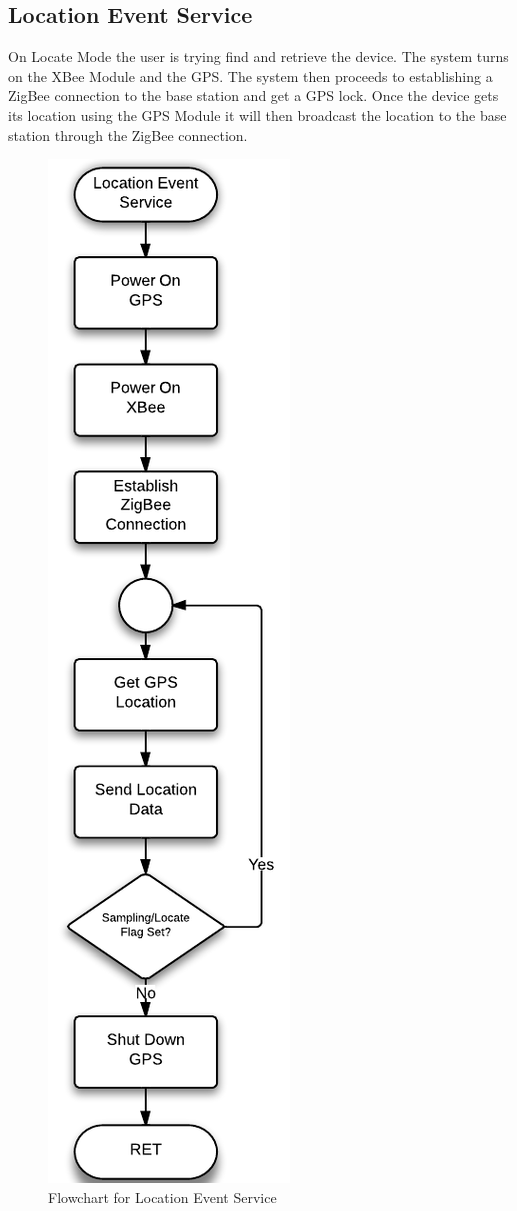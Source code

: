 \subsection{Location Event Service}
On Locate Mode the user is trying find and retrieve the device. The system turns on the XBee Module and the GPS. The system then proceeds to establishing a ZigBee connection to the base station and get a GPS lock. Once the device gets its location using the GPS Module it will then broadcast the location to the base station through the ZigBee connection.
\begin{figure}[H]
	\centering
	\includegraphics[scale=0.8]{img/LocationEventService}
	\caption{Flowchart for Location Event Service \label{fig:locateMode}}
\end{figure}

